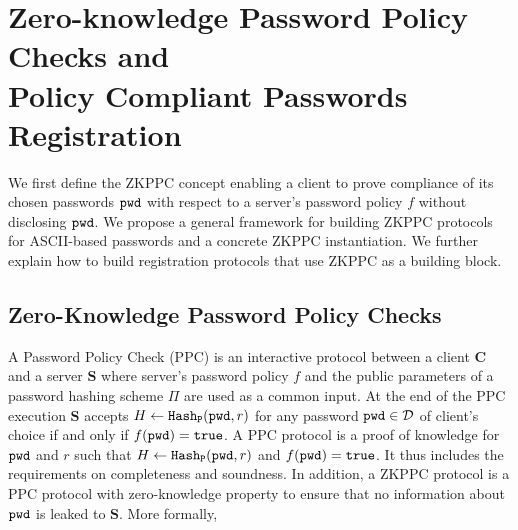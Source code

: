 \section{Zero-knowledge Password Policy Checks and\\ Policy Compliant Passwords Registration} \label{sec:zkppc}




We first define the ZKPPC concept enabling a client to prove compliance of its chosen passwords $\mathtt{pwd}$ with respect to a server's password policy $f$ without disclosing $\mathtt{pwd}$. We propose a general framework for building ZKPPC protocols for ASCII-based passwords and a concrete ZKPPC instantiation. We further explain how to build registration protocols that use ZKPPC as a building block.

\subsection{Zero-Knowledge Password Policy Checks}
A Password Policy Check (PPC) is an interactive protocol between a client $\bm{C}$ and a server $\bm{S}$ where server's password policy $f$ and the public parameters of a password hashing scheme $\Pi$ are used as a common input. At the end of the PPC execution $\bm{S}$ accepts $H\gets \mathtt{Hash_P}(\mathtt{pwd},r)$ for any password $\mathtt{pwd}\in\mathcal{D}$ of client's choice if and only if $f(\mathtt{pwd})=\mathtt{true}$. A PPC protocol is a proof of knowledge for $\mathtt{pwd}$ and $r$ such that $H\gets \mathtt{Hash_P}(\mathtt{pwd},r)$ and $f(\mathtt{pwd})=\mathtt{true}$. It thus includes the requirements on completeness and soundness. In addition, a ZKPPC protocol is a PPC protocol with zero-knowledge property to ensure that no information about $\mathtt{pwd}$ is leaked to $\bm{S}$. More formally, %

